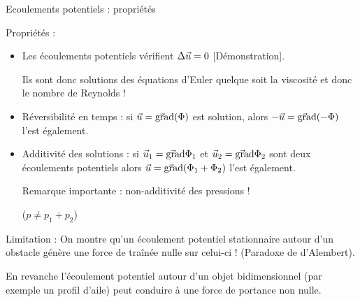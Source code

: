 \begin{frame}{Ecoulements potentiels : propriétés} \hypertarget{frame:toto}{}

\small

Propriétés : 

\begin{itemize}
\item Les écoulements potentiels vérifient $\Delta {\vec{u}} =0$ {\color{gris} [Démonstration]}. 

Ils sont donc solutions des équations d'Euler quelque soit la viscosité et donc le nombre de Reynolds !
\pause

  
\smallskip
\item Réversibilité en temps  : si $\vec{u} = \vec{\mbox{\rm gra}}\mbox{\rm d} (\Phi)$ est solution, alors 
$- \vec{u} = \vec{\mbox{\rm gra}}\mbox{\rm d} (- \Phi)$ l'est également.
  
  \pause 
\smallskip
\item Additivité des solutions : si $\vec{u}_1 = \vec{\mbox{\rm gra}}\mbox{\rm d} \Phi_1$ et $\vec{u} _2 = \vec{\mbox{\rm gra}}\mbox{\rm d} \Phi_2$ 
sont deux écoulements potentiels alors 
$\vec{u} = \vec{\mbox{\rm gra}}\mbox{\rm d} (\Phi_1+\Phi_2)$ l'est également.

\pause
\medskip 
Remarque importante : non-additivité des pressions !

($p \ne p_1 + p_2$)



\end{itemize}

\pause

\bigskip



\medskip

Limitation : On montre qu'un écoulement potentiel stationnaire autour d'un obstacle génère une force
de traînée nulle sur celui-ci ! (Paradoxe de d'Alembert).

\smallskip

En revanche l'écoulement potentiel autour d'un objet bidimensionnel (par exemple un profil d'aile) peut conduire à une force de portance non nulle.

\smallskip


\vspace{0mm}
\end{frame}



